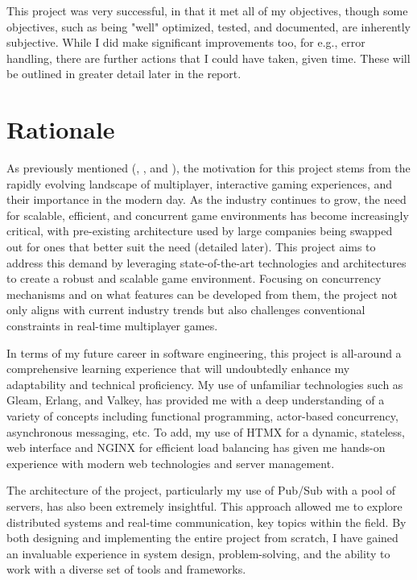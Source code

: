 \documentclass[]{final}
\begin{document}
\label{successful}

This project was very successful, in that it met all of my objectives,
though some objectives, such as being "well" optimized, tested, and documented, are
inherently subjective. While I did make significant
improvements too, for e.g., error handling,
there are further actions that I could have taken, given time.
These will be outlined in greater detail later in the report.

\section{Rationale}

\label{rationale}

As previously mentioned {\hypersetup{linkcolor=teal}(\pageref{rationale_importance}, \pageref{rationale_problem},
    and \pageref{rationale_abstract})},
the motivation for this project stems from the
rapidly evolving landscape of multiplayer, interactive gaming experiences,
and their importance in the modern day.
As the industry continues to grow, the need for scalable,
efficient, and concurrent game environments has become increasingly
critical, with pre-existing architecture used by large companies
being swapped out for ones that better suit the need (detailed later).
This project aims to address this demand by leveraging
state-of-the-art technologies and architectures
to create a robust and scalable game environment.
Focusing on concurrency
mechanisms and on what features can be developed from them, the project
not only aligns with current industry trends but
also challenges conventional constraints in real-time multiplayer games.

In terms of my future career in software engineering, this project is all-around a comprehensive learning experience that will undoubtedly enhance my adaptability and technical proficiency.
My use of unfamiliar technologies such as Gleam, Erlang, and Valkey, has provided me with a deep understanding of a variety of concepts including functional programming, actor-based concurrency, asynchronous messaging, etc.
To add, my use of HTMX for a dynamic, stateless, web interface and NGINX for efficient load balancing has given me hands-on
experience with modern web technologies and server management.

The architecture of the project, particularly my use of Pub/Sub with a pool of servers, has also been extremely insightful.
This approach allowed me to explore distributed systems and real-time communication, key topics within the field.
By both designing and implementing the entire project from scratch, I have gained an invaluable experience in system design, problem-solving, and the ability to work with a diverse set of tools and frameworks.
\end{document}
